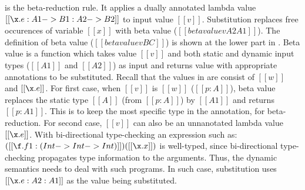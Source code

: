  is the beta-reduction rule. It applies a dually
annotated lambda value $[[\x.e : A1 -> B1 : A2 -> B2]]$ to input
value $[[v]]$. Substitution replaces free occurences of variable
$[[x]]$ with beta value ($[[betavalue v A2 A1]]$).
The definition of beta value ($[[betavalue v B C]]$) is shown at the lower part in 
.
Beta value is a function which takes
value $[[v]]$ and both static and dynamic input types 
($[[A1]]$ and $[[A2]]$) as input and returns value with
appropriate annotations to be substituted.
Recall that the values in \cal are consist of $[[w]]$ and $[[\x.e]]$.
For first case, when $[[v]]$ is $[[w]]$ ($[[p:A]]$), beta value replaces the static type
$[[A]]$ (from $[[p:A]]$) by $[[A1]]$ and returns $[[p:A1]]$.
This is to keep the most specific type in the annotation, for beta-reduction.
For second case, $[[v]]$ can also be an unnanotated lambda value $[[\x.e]]$.
With bi-directional type-checking an expression such as:
$([[\f.f 1: (Int -> Int -> Int)]]) ([[\x.x]])$
is well-typed, since bi-directional type-checking propagates
type information to the arguments. Thus, the dynamic semantics
needs to deal with such programs.
In such case, substitution uses $[[\x.e:A2:A1]]$ as the value being substituted.








